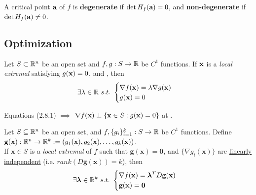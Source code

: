 \documentclass[11pt]{article}
\begin{document}
			\begin{definition}
				A critical point $\textbf{a}$ of $f$ is \textbf{degenerate} if $\det H_f(\textbf{a}) = 0$, and \textbf{non-degenerate} if $\det H_f(\textbf{a}) \neq 0$.
			\end{definition}
		
		\subsection{Optimization}
			\begin{theorem}
				Let $S \subset \mathbb{R}^n$ be an open set and $f, g: S \to \mathbb{R}$ be $C^1$ functions. If $\textbf{x}$ is a \emph{local extremal} satisfying $g(\textbf{x}) = 0$, and , then
				\begin{equation}
					\exists \lambda \in \mathbb{R}\ s.t.\ \begin{cases}
						\nabla f(\textbf{x}) = \lambda \nabla g(\textbf{x}) \\
						g(\textbf{x}) = 0
					\end{cases}
				\end{equation}
			\end{theorem}
			
			
			\begin{proposition}
				Equations (2.8.1) $\implies$ $\nabla f(\textbf{x}) \perp \{\textbf{x} \in S:g(\textbf{x})=0\}$ at \tbf{x}.
			\end{proposition}
			
			\begin{theorem}
				Let $S \subseteq \mathbb{R}^n$ be an open set, and $f, \{g_i\}_{i=1}^k : S \to \mathbb{R}$ be $C^1$ functions. Define $\textbf{g}(\textbf{x}): \mathbb{R}^n \to \mathbb{R}^k := (g_1(\textbf{x}), g_2(\textbf{x}), \dots, g_k(\textbf{x}))$. \\
				If $\textbf{x} \in S$ is a \emph{local extremal} of $f$ such that $\textbf{g}(\textbf{x}) = \textbf{0}$, and $\{\nabla g_i(\textbf{x})\}$ are \ul{linearly independent} (i.e. $rank(D\textbf{g}(\textbf{x})) = k$), then
				\begin{equation}
					\exists \boldsymbol{\lambda} \in \R^k\ s.t.\ \begin{cases}
						\nabla f(\textbf{x}) = \boldsymbol{\lambda}^T D\textbf{g}(\textbf{x}) \\
						\textbf{g}(\textbf{x}) =\textbf{0}
					\end{cases}
				\end{equation}
			\end{theorem}
			
\end{document}
